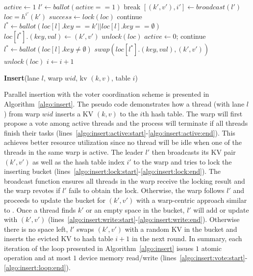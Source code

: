 \begin{algorithm}[t]
	\begin{algorithmic}[1]
		\State $active \gets 1$	\label{algo:insert:active:start}
		\State $l' \gets ballot(active == 1)$ \label{algo:insert:vote:start}
		\State break \label{algo:insert:active:end}
		\EndIf
		\State $[(k',v'),i'] \gets broadcast(l')$ \label{algo:insert:lock:start}
		\State $loc = h^{i'}(k')$
		\State $success \gets lock(loc)$ \label{algo:insert:lock:end}
		\EndIf
		\State continue					\label{algo:insert:vote:end}
		\EndIf
		\State $l^* \gets ballot(loc[l].key == k' || loc[l].key ==\emptyset)$ \label{algo:insert:write:start}
		\State $loc[l^*].(key,val) \gets (k',v')$
		\State $unlock(loc)$
		\State $active \gets 0$;
		\State continue			\label{algo:insert:write:end}
		\EndIf
		\State $l^* \gets ballot(loc[l].key \neq \emptyset)$
		\State $swap(loc[l^*].(key,val),(k',v'))$
		\State $unlock(loc)$
		\State $i \gets i+1$ \label{algo:insert:loop:end}
		\EndIf
		\EndWhile
	\end{algorithmic}
	\caption{\textbf{Insert}(lane $l$, warp $wid$, kv $(k,v)$, table $i$)}\label{algo:insert}
\end{algorithm}

Parallel insertion with the voter coordination scheme is presented in Algorithm~\ref{algo:insert}.
The pseudo code demonstrates how a thread (with lane $l$) from warp $wid$ inserts a KV $(k,v)$ to the $i$th hash table. 
The warp will first propose a vote among active threads and the process will terminate if all threads finish their tasks (lines~\ref{algo:insert:active:start}-\ref{algo:insert:active:end}).  
This achieves better resource utilization since no thread will be idle when one of the threads in the same warp is active.  
The leader $l'$ then broadcasts its KV pair $(k',v')$ as well as the hash table index $i'$ to the warp and tries to lock the inserting bucket (lines~\ref{algo:insert:lock:start}-\ref{algo:insert:lock:end}). 
The broadcast function ensures all threads in the warp receive the locking result and the warp revotes if $l'$ fails to obtain the lock.
Otherwise, the warp follows $l'$ and proceeds to update the bucket for $(k',v')$ with a warp-centric approach similar to .
Once a thread finds $k'$ or an empty space in the bucket, $l'$ will add or update with $(k',v')$ (lines~\ref{algo:insert:write:start}-\ref{algo:insert:write:end}).
Otherwise there is no space left, $l'$ swaps $(k',v')$ with a random KV in the bucket and inserts the evicted KV to hash table $i+1$ in the next round. 
In summary, each iteration of the loop presented in Algorithm~\ref{algo:insert} issues $1$ atomic operation and at most $1$ device memory read/write (lines~\ref{algo:insert:vote:start}-\ref{algo:insert:loop:end}).  

